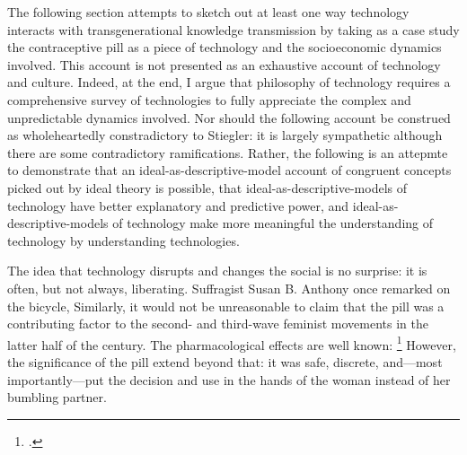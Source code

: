 \documentclass[letterpaper,notitlepage,12pt]{article}
\begin{document}

The following section attempts to sketch out at least one way technology
interacts with transgenerational knowledge transmission by taking as a case
study the contraceptive pill as a piece of technology and the socioeconomic
dynamics involved. This account is not presented as an exhaustive account of
technology and culture.
Indeed, at the end, I argue that philosophy of technology requires a
comprehensive survey of technologies to fully appreciate the complex and
unpredictable dynamics involved. Nor should the following account be construed
as wholeheartedly constradictory to Stiegler: it is largely sympathetic although
there are some contradictory ramifications.
Rather, the following is an attepmte to demonstrate that an
ideal-as-descriptive-model account of congruent concepts picked out by ideal
theory is possible, that ideal-as-descriptive-models of technology have better
explanatory and predictive power, and ideal-as-descriptive-models of technology
make more meaningful the understanding of technology by understanding
technologies.

The idea that technology disrupts and changes the social is no surprise: it is
often, but not always, liberating.
Suffragist Susan B. Anthony once remarked on the bicycle, 
Similarly, it would not be unreasonable to claim that the pill was a
contributing factor to the second- and third-wave feminist movements in the
latter half of the  century. The pharmacological effects are well known:
\footcite[p.
731]{goldin_power_2002} However, the significance of the pill extend beyond that:
it was safe, discrete, and---most importantly---put the decision and use in the 
hands of the woman instead of her bumbling partner.
\end{document}
